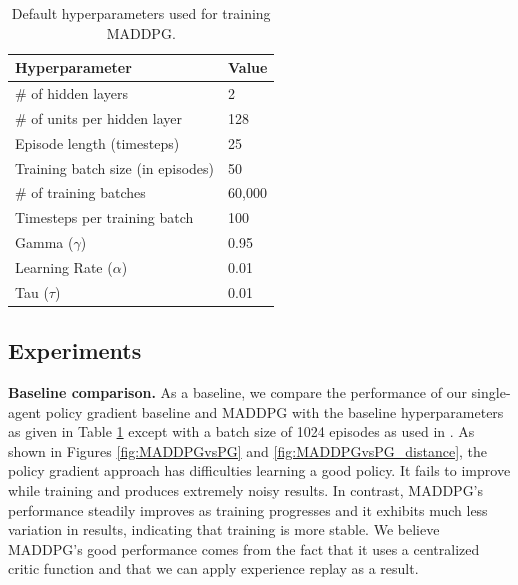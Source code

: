 \documentclass{article}
\begin{document}
\begin{table}[h!]
  \begin{center}
    
    \label{tab:basecase_parameters}
    \begin{tabular} {|l|l|} %
      \hline
      \textbf{Hyperparameter} & \textbf{Value} \\
      \hline
      \# of hidden layers & 2 \\
      \# of units per hidden layer & 128 \\
      Episode length (timesteps) & 25 \\
      Training batch size (in episodes) & 50 \\
      \# of training batches & 60,000 \\
			Timesteps per training batch & 100 \\
      Gamma ($\gamma$) & 0.95 \\
      Learning Rate ($\alpha$) & 0.01 \\
			Tau ($\tau$) & 0.01 \\
      \hline
    \end{tabular}
  \end{center}
	\caption{Default hyperparameters used for training MADDPG.}
\end{table}

\subsection{Experiments}

\textbf{Baseline comparison.} As a baseline, we compare the performance of our single-agent policy gradient baseline and MADDPG with the baseline hyperparameters as given in Table \ref{tab:basecase_parameters} except with a batch size of 1024 episodes as used in \cite{maddpg}. As shown in Figures \ref{fig:MADDPGvsPG} and \ref{fig:MADDPGvsPG_distance}, the policy gradient approach has difficulties learning a good policy. It fails to improve while training and produces extremely noisy results. In contrast, MADDPG's performance steadily improves as training progresses and it exhibits much less variation in results, indicating that training is more stable. We believe MADDPG's good performance comes from the fact that it uses a centralized critic function and that we can apply experience replay as a result.
\end{document}
